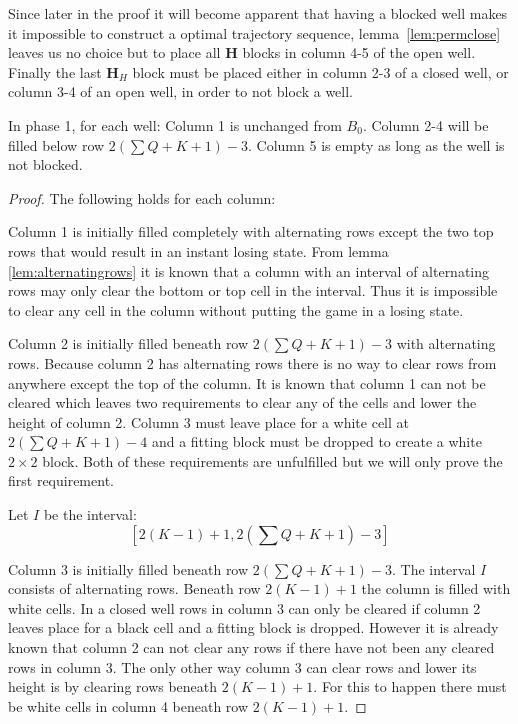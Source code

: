 Since later in the proof it will become apparent that having a blocked well makes it impossible to construct a optimal trajectory sequence, lemma~\ref{lem:permclose} leaves us no choice but to place all $\mathbf{H}$ blocks in column 4-5 of the open well. Finally the last $\mathbf{H}_H$ block must be placed either in column 2-3 of a closed well, or column 3-4 of an open well, in order to not block a well.

\bigbreak

\begin{lem}
In phase 1, for each well: Column 1 is unchanged from $B_0$. Column 2-4 will be filled below row $2 \left( \sum Q + K + 1 \right) - 3$. Column 5 is empty as long as the well is not blocked.
\end{lem}

\begin{proof}
The following holds for each column:

Column 1 is initially filled completely with alternating rows except the two top rows that would result in an instant losing state. From lemma \ref{lem:alternatingrows} it is known that a column with an interval of alternating rows may only clear the bottom or top cell in the interval. Thus it is impossible to clear any cell in the column without putting the game in a losing state. 

Column 2 is initially filled beneath row $2 \left( \sum Q + K + 1 \right) - 3$ with alternating rows. Because column 2 has alternating rows there is no way to clear rows from anywhere except the top of the column. It is known that column 1 can not be cleared which leaves two requirements to clear any of the cells and lower the height of column 2. Column 3 must leave place for a white cell at $2 \left( \sum Q + K + 1 \right) - 4$ and a fitting block must be dropped to create a white $2 \times 2$ block. Both of these requirements are unfulfilled but we will only prove the first requirement.

Let $I$ be the interval:
\begin{equation*}
\left[ 2 \left( K - 1 \right) + 1, 2 \left( \sum Q + K + 1 \right) - 3 \right]
\end{equation*}

Column 3 is initially filled beneath row $2 \left( \sum Q + K + 1 \right) - 3$. The interval $I$ consists of alternating rows. Beneath row $2 \left( K - 1 \right) + 1$ the column is filled with white cells. In a closed well rows in column 3 can only be cleared if column 2 leaves place for a black cell and a fitting block is dropped. However it is already known that column 2 can not clear any rows if there have not been any cleared rows in column 3. The only other way column 3 can clear rows and lower its height is by clearing rows beneath $2 \left( K - 1 \right) + 1$. For this to happen there must be white cells in column 4 beneath row $2 \left( K - 1 \right) + 1$.


\end{proof}
